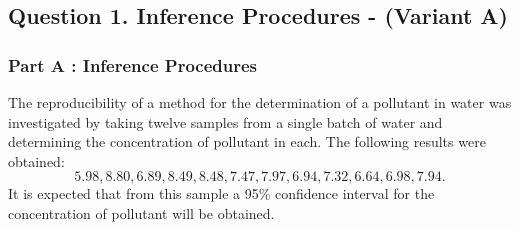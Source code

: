 \documentclass[a4paper,12pt]{article}
\begin{document}
\subsection*{Question 1. Inference Procedures - (Variant A) }
\subsubsection*{Part A : Inference Procedures}

The reproducibility of a method for the determination of a pollutant in water was investigated by
taking twelve samples from a single batch of water and determining the concentration of pollutant
in each. The following results were obtained:\[ 5.98, 8.80, 6.89, 8.49, 8.48, 7.47, 7.97, 6.94, 7.32, 6.64,
6.98, 7.94. \]
It is expected that from this sample a 95\% confidence interval for the concentration of
pollutant will be obtained.
\end{document}
